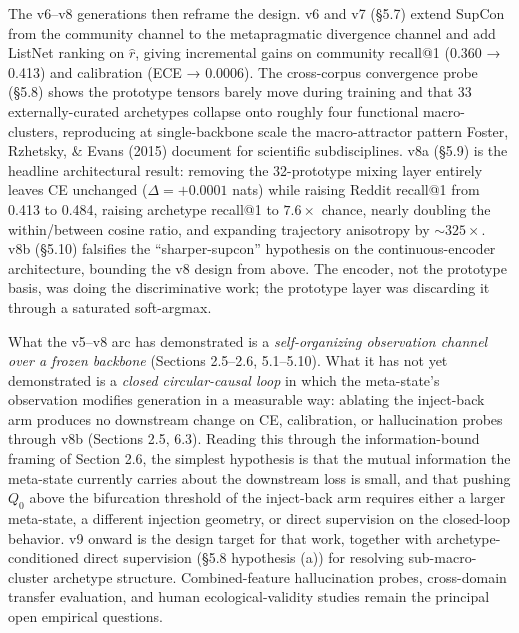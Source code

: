 \documentclass[
  11pt]{article}
\begin{document}
The v6--v8 generations then reframe the design. v6 and v7 (§5.7) extend
SupCon from the community channel to the metapragmatic divergence
channel and add ListNet ranking on \(\hat{r}\), giving incremental gains
on community recall@1 (0.360 → 0.413) and calibration (ECE → 0.0006).
The cross-corpus convergence probe (§5.8) shows the prototype tensors
barely move during training and that 33 externally-curated archetypes
collapse onto roughly four functional macro-clusters, reproducing at
single-backbone scale the macro-attractor pattern Foster, Rzhetsky, \&
Evans (2015) document for scientific subdisciplines. v8a (§5.9) is the
headline architectural result: removing the 32-prototype mixing layer
entirely leaves CE unchanged (\(\Delta = +0.0001\) nats) while raising
Reddit recall@1 from 0.413 to 0.484, raising archetype recall@1 to
\(7.6\times\) chance, nearly doubling the within/between cosine ratio,
and expanding trajectory anisotropy by \(\sim 325\times\). v8b (§5.10)
falsifies the ``sharper-supcon'' hypothesis on the continuous-encoder
architecture, bounding the v8 design from above. The encoder, not the
prototype basis, was doing the discriminative work; the prototype layer
was discarding it through a saturated soft-argmax.

What the v5--v8 arc has demonstrated is a \emph{self-organizing
observation channel over a frozen backbone} (Sections 2.5--2.6,
5.1--5.10). What it has not yet demonstrated is a \emph{closed
circular-causal loop} in which the meta-state's observation modifies
generation in a measurable way: ablating the inject-back arm produces no
downstream change on CE, calibration, or hallucination probes through
v8b (Sections 2.5, 6.3). Reading this through the information-bound
framing of Section 2.6, the simplest hypothesis is that the mutual
information the meta-state currently carries about the downstream loss
is small, and that pushing \(Q_0\) above the bifurcation threshold of
the inject-back arm requires either a larger meta-state, a different
injection geometry, or direct supervision on the closed-loop behavior.
v9 onward is the design target for that work, together with
archetype-conditioned direct supervision (§5.8 hypothesis (a)) for
resolving sub-macro-cluster archetype structure. Combined-feature
hallucination probes, cross-domain transfer evaluation, and human
ecological-validity studies remain the principal open empirical
questions.
\end{document}
